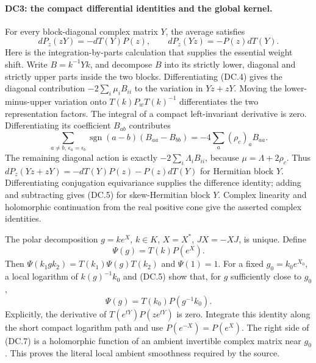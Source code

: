 \paragraph{DC3: the compact differential identities and the global kernel.}
\label{claim:DC3}
For every block-diagonal complex matrix $Y$, the average satisfies
\[
 dP_z(zY)=-dT(Y)P(z),\qquad dP_z(Yz)=-P(z)dT(Y).                \tag{DC.5}
\]
Here is the integration-by-parts calculation that supplies the essential
weight shift.  Write $B=k^{-1}Yk$, and decompose $B$ into its strictly lower,
diagonal and strictly upper parts inside the two blocks.  Differentiating
(DC.4) gives the diagonal contribution $-2\sum_i\mu_i B_{ii}$ to the
variation in $Yz+zY$.  Moving the lower-minus-upper variation onto
$T(k)P_wT(k)^{-1}$ differentiates the two representation factors.
The integral of a compact left-invariant derivative is zero.  Differentiating
its coefficient $B_{ab}$ contributes
\[
 \sum_{a\ne b,\,\epsilon_a=\epsilon_b}
       \operatorname{sgn}(a-b)(B_{aa}-B_{bb})
       =-4\sum_a(\rho_c)_aB_{aa}.
\]
The remaining diagonal action is exactly $-2\sum_i\Lambda_iB_{ii}$,
because $\mu=\Lambda+2\rho_c$.  Thus
$dP_z(Yz+zY)=-dT(Y)P(z)-P(z)dT(Y)$ for Hermitian block $Y$.
Differentiating conjugation equivariance supplies the difference identity;
adding and subtracting gives (DC.5) for skew-Hermitian block $Y$.
Complex linearity and holomorphic continuation from the real positive
cone give the asserted complex identities.

The polar decomposition $g=k e^X$, $k\in K$, $X=X^*$, $JX=-XJ$, is unique.
Define
\[
             \Psi(g)=T(k)P(e^X).                               \tag{DC.6}
\]
Then $\Psi(k_1gk_2)=T(k_1)\Psi(g)T(k_2)$ and $\Psi(1)=1$.
For a fixed $g_0=k_0e^{X_0}$, a local logarithm of $k(g)^{-1}k_0$ and
(DC.5) show that, for $g$ sufficiently close to $g_0$,
\[
                  \Psi(g)=T(k_0)P(g^{-1}k_0).                  \tag{DC.7}
\]
Explicitly, the derivative of $T(e^{tY})P(ze^{tY})$ is zero.
Integrate this identity along the short compact logarithm path and use
$P(e^{-X})=P(e^X)$.  The right side of (DC.7) is a holomorphic function
of an ambient invertible complex matrix near $g_0$.  This proves the
literal local ambient smoothness required by the source.

